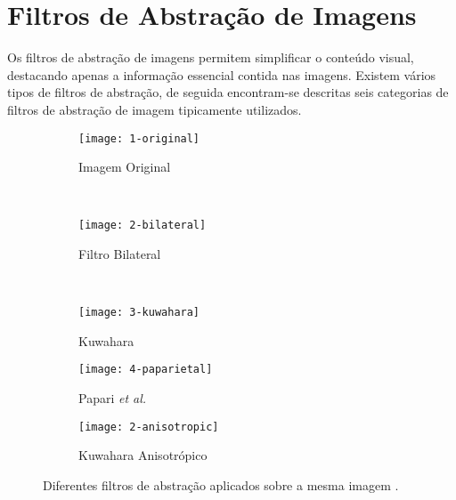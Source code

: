 \section{Filtros de Abstração de Imagens}
Os filtros de abstração de imagens permitem simplificar o conteúdo visual, destacando apenas a informação essencial contida nas imagens. Existem vários tipos de filtros de abstração, de seguida encontram-se descritas seis categorias de filtros de abstração de imagem tipicamente utilizados.
\begin{figure}
        \centering
        \begin{subfigure}[b]{0.3\textwidth}
                \centering
                \texttt{[image: 1-original]}
                \caption{Imagem Original}
                \label{fig:original}
        \end{subfigure}%
        ~ %
        \begin{subfigure}[b]{0.3\textwidth}
                \centering
                \texttt{[image: 2-bilateral]}
                \caption{Filtro Bilateral}
                \label{fig:bilateral}
        \end{subfigure}
        ~ %
        \begin{subfigure}[b]{0.3\textwidth}
                \centering
                \texttt{[image: 3-kuwahara]}
                \caption{Kuwahara}
                \label{fig:kuwahara}
        \end{subfigure}
        \begin{subfigure}[b]{0.3\textwidth}
                \centering
                \texttt{[image: 4-paparietal]}
                \caption{Papari \textit{et al.}}
                \label{fig:papari}
        \end{subfigure}
        \begin{subfigure}[b]{0.3\textwidth}
                \centering
                \texttt{[image: 2-anisotropic]}
                \caption{Kuwahara Anisotrópico}
                \label{fig:anisotropic}
        \end{subfigure}
        \caption{Diferentes filtros de abstração aplicados sobre a mesma imagem \cite{Kyprianidis2009}.}\label{fig:filtrosabtracao}
\end{figure}

